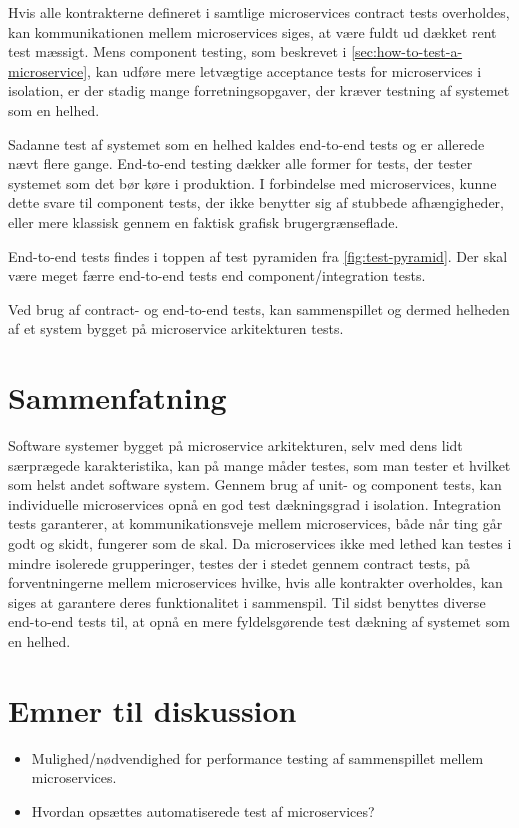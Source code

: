 \documentclass{article}
\begin{document}
Hvis alle kontrakterne defineret i samtlige microservices contract tests overholdes, kan kommunikationen mellem microservices siges, at være fuldt ud dækket rent test mæssigt. Mens component testing, som beskrevet i \ref{sec:how-to-test-a-microservice}, kan udføre mere letvægtige acceptance tests for microservices i isolation, er der stadig mange forretningsopgaver, der kræver testning af systemet som en helhed.

Sadanne test af systemet som en helhed kaldes end-to-end tests og er allerede nævt flere gange. End-to-end testing dækker alle former for tests, der tester systemet som det bør køre i produktion. I forbindelse med microservices, kunne dette svare til component tests, der ikke benytter sig af stubbede afhængigheder, eller mere klassisk gennem en faktisk grafisk brugergrænseflade.

End-to-end tests findes i toppen af test pyramiden fra \cref{fig:test-pyramid}. Der skal være meget færre end-to-end tests end component/integration tests.

Ved brug af contract- og end-to-end tests, kan sammenspillet og dermed helheden af et system bygget på microservice arkitekturen tests.

\section{Sammenfatning}

Software systemer bygget på microservice arkitekturen, selv med dens lidt særprægede karakteristika, kan på mange måder testes, som man tester et hvilket som helst andet software system. Gennem brug af unit- og component tests, kan individuelle microservices opnå en god test dækningsgrad i isolation. Integration tests garanterer, at kommunikationsveje mellem microservices, både når ting går godt og skidt, fungerer som de skal. Da microservices ikke med lethed kan testes i mindre isolerede grupperinger, testes der i stedet gennem contract tests, på forventningerne mellem microservices hvilke, hvis alle kontrakter overholdes, kan siges at garantere deres funktionalitet i sammenspil. Til sidst benyttes diverse end-to-end tests til, at opnå en mere fyldelsgørende test dækning af systemet som en helhed.

\section{Emner til diskussion}

\begin{itemize}
    \item{Mulighed/nødvendighed for performance testing af sammenspillet mellem microservices.}
    \item{Hvordan opsættes automatiserede test af microservices?}
\end{itemize}

\newpage

\printbibliography
\end{document}
